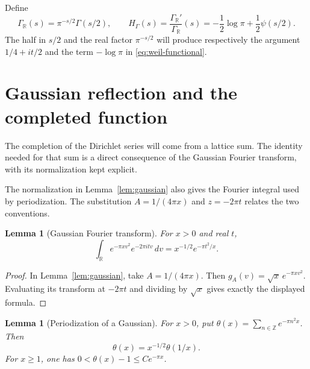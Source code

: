 \documentclass[11pt]{article}
\newtheorem{lemma}[theorem]{Lemma}
\theoremstyle{definition}
\theoremstyle{remark}
\numberwithin{equation}{section}
\newcommand{\R}{\mathbb R}
\newcommand{\Z}{\mathbb Z}
\begin{document}
Define
\begin{equation}
 \Gamma_{\R}(s)=\pi^{-s/2}\Gamma(s/2),\qquad
 H_\Gamma(s)=\frac{\Gamma_{\R}'}{\Gamma_{\R}}(s)
          =-\frac12\log\pi+\frac12\psi(s/2).
 \label{eq:gamma-real}
\end{equation}
The half in $s/2$ and the real factor $\pi^{-s/2}$ will produce respectively
the argument $1/4+it/2$ and the term $-\log\pi$ in \eqref{eq:weil-functional}.

\section{Gaussian reflection and the completed function}
\label{sec:theta}

The completion of the Dirichlet series will come from a lattice sum.
The identity needed for that sum is a direct consequence of the Gaussian
Fourier transform, with its normalization kept explicit.

The normalization in Lemma~\ref{lem:gaussian} also gives the Fourier
integral used by periodization.  The substitution
$A=1/(4\pi x)$ and $z=-2\pi t$ relates the two conventions.

\begin{lemma}[Gaussian Fourier transform]
\label{lem:gaussian-real-transform}
For $x>0$ and real $t$,
\[
 \int_{\R}e^{-\pi xv^2}e^{-2\pi itv}\,dv
       =x^{-1/2}e^{-\pi t^2/x}.
\]
\end{lemma}
\begin{proof}
In Lemma~\ref{lem:gaussian}, take $A=1/(4\pi x)$.
Then $g_A(v)=\sqrt{x}\,e^{-\pi xv^2}$.
Evaluating its transform at $-2\pi t$ and dividing by $\sqrt{x}$
gives exactly the displayed formula.
\end{proof}

\begin{lemma}[Periodization of a Gaussian]
\label{lem:theta}
For $x>0$, put $\theta(x)=\sum_{n\in\Z}e^{-\pi n^2x}$.
Then
\begin{equation}
 \theta(x)=x^{-1/2}\theta(1/x).
 \label{eq:theta-reflection}
\end{equation}
For $x\geq1$, one has $0<\theta(x)-1\leq C e^{-\pi x}$.
\end{lemma}
\end{document}
